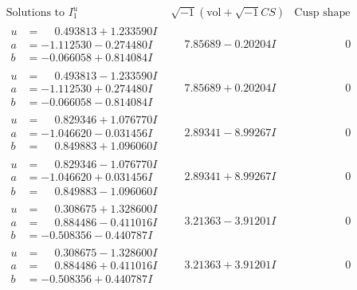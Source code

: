 \documentclass[1p]{elsarticle_modified}
\theoremstyle{definition}
\newcommand{\I}{\sqrt{-1}}
\begin{document}
$$\begin{array}{c|c|c}
\text{Solutions to }I^u_{1}& \I (\text{vol} + \sqrt{-1}CS) & \text{Cusp shape}\\
 \hline 
\begin{aligned}
u &= \phantom{-}0.493813 + 1.233590 I \\
a &= -1.112530 - 0.274480 I \\
b &= -0.066058 + 0.814084 I\end{aligned}
 & \phantom{-}7.85689 - 0.20204 I & \phantom{-0.000000 } 0 \\ \hline\begin{aligned}
u &= \phantom{-}0.493813 - 1.233590 I \\
a &= -1.112530 + 0.274480 I \\
b &= -0.066058 - 0.814084 I\end{aligned}
 & \phantom{-}7.85689 + 0.20204 I & \phantom{-0.000000 } 0 \\ \hline\begin{aligned}
u &= \phantom{-}0.829346 + 1.076770 I \\
a &= -1.046620 - 0.031456 I \\
b &= \phantom{-}0.849883 + 1.096060 I\end{aligned}
 & \phantom{-}2.89341 - 8.99267 I & \phantom{-0.000000 } 0 \\ \hline\begin{aligned}
u &= \phantom{-}0.829346 - 1.076770 I \\
a &= -1.046620 + 0.031456 I \\
b &= \phantom{-}0.849883 - 1.096060 I\end{aligned}
 & \phantom{-}2.89341 + 8.99267 I & \phantom{-0.000000 } 0 \\ \hline\begin{aligned}
u &= \phantom{-}0.308675 + 1.328600 I \\
a &= \phantom{-}0.884486 - 0.411016 I \\
b &= -0.508356 - 0.440787 I\end{aligned}
 & \phantom{-}3.21363 - 3.91201 I & \phantom{-0.000000 } 0 \\ \hline\begin{aligned}
u &= \phantom{-}0.308675 - 1.328600 I \\
a &= \phantom{-}0.884486 + 0.411016 I \\
b &= -0.508356 + 0.440787 I\end{aligned}
 & \phantom{-}3.21363 + 3.91201 I & \phantom{-0.000000 } 0 \\ \hline\begin{aligned}

\end{aligned}
\end{array}$$
\end{document}
